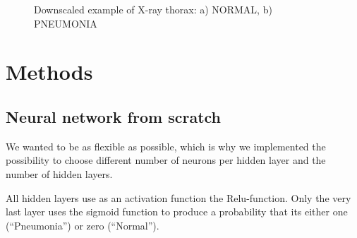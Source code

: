 \documentclass{article}
\begin{document}
\begin{figure}[ht]
  \centering
  \centering
  \caption{Downscaled example of X-ray thorax: a) NORMAL, b) PNEUMONIA}
  \label{fig:thorax_xRay_example}
\end{figure}


\section{Methods}

\subsection{Neural network from scratch}
\label{sec:neural_network_from_scarch}

We wanted to be as flexible as possible, which is why we implemented the possibility to choose 
different number of neurons per hidden layer and the number of hidden layers.

All hidden layers use as an activation function the Relu-function. 
Only the very last layer uses the sigmoid function to produce a probability that its either one (“Pneumonia”) 
or zero (“Normal”).
\end{document}
